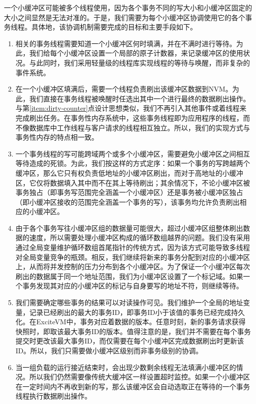 一个小缓冲区可能被多个线程使用，因为各个事务不同的写大小和小缓冲区固定的大小之间显然是无法对准的。于是，我们需要为每个小缓冲区协调使用它的各个事务线程。具体地，该协调机制需要完成的目标和主要手段如下。
\begin{enumerate}
\item \label{item:dirty-counter} 相关的事务线程需要知道一个小缓冲区何时填满，并在不满时进行等待。为此，我们给每个小缓冲区设置一个局部的原子计数器，来记录缓冲区的使用状况。与此同时，我们采用轻量级的线程库实现线程的等待与唤醒，而非复杂的事件系统。
\item 在一个小缓冲区填满后，需要一个线程负责刷出该缓冲区数据到NVM。为此，我们直接在事务线程被唤醒时任选出其中一个进行最终的数据刷出操作。与第\ref{item:dirty-counter}点设计思想类似，我们不再引入其他事件或着线程来完成刷出任务。在事务性内存系统中，这些事务线程即为应用程序的线程，而不像数据库中工作线程与客户请求的线程相互独立。所以，我们的实现方式与事务性内存的特点相一致。
\item 一个事务线程的写可能跨域两个或多个小缓冲区，需要避免小缓冲区之间相互等待造成的死锁。为此，我们按这样的方式定序：如果一个事务的写跨越两个缓冲区，那么它只有权负责低地址的小缓冲区刷出，而对于高地址的小缓冲区，它仅将数据填入其中而不在其上等待刷出；其余情况下，不论小缓冲区被事务独占（即事务写范围完全涵盖一个小缓冲区）还是事务被小缓冲区独占（即小缓冲区接收的范围完全涵盖一个事务的写），该事务均允许负责刷出相应的小缓冲区。
\item 由于各个事务写往小缓冲区组的数据量可能很大，超过小缓冲区组整体刷出数据的速度，所以需要处理小缓冲区构成的循环数组越界的问题。我们没有采用通过全局变量维护循环数组首尾指针的传统方式，因为该方式可能导致多线程对全局变量竞争的瓶颈。相反，我们继续将新来的事务分配到对应的小缓冲区上，从而将并发控制的压力分布到各个小缓冲区。为了保证一个小缓冲区每次刷出的数据属于同一个地址范围，我们为小缓冲区设置了一个标记域。如果一个事务发现其对应的小缓冲区的标记与自身要写的地址不符，则继续等待。
\item 我们需要确定哪些事务的结果可以对读操作可见。我们维护一个全局的地址变量，记录已经刷出的最大的事务ID，即事务ID小于该值的事务已经完成持久化。在ExciteVM中，事务对应着数据的版本。任意时刻，新的事务请求获得快照时，即取该最大事务ID的版本。值得注意的是，我们并不需要在每个事务提交时更改该最大事务ID，而仅需要在每个小缓冲区完成数据刷出时更新该ID。所以，我们只需要做小缓冲区级别而非事务级别的协调。
\item 当一组负载的运行接近结束时，会出现少数剩余线程无法填满小缓冲区的情况。所以我们仍然需要像传统大缓冲区一样设置超时监控。如果一个小缓冲区在一定时间内不再收到新的写，那么该缓冲区会自动选取正在等待的一个事务线程执行数据刷出操作。
\end{enumerate}

